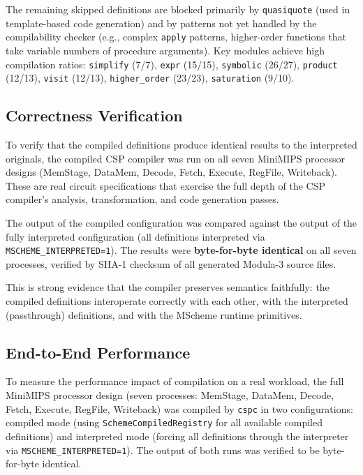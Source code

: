 \documentclass[12pt]{report}
\begin{document}
The remaining skipped definitions are blocked primarily by
\texttt{quasiquote} (used in template-based code generation)
and by patterns not yet handled by the compilability checker
(e.g., complex \texttt{apply} patterns, higher-order functions
that take variable numbers of procedure arguments).
Key modules achieve high compilation ratios:
\texttt{simplify} (7/7), \texttt{expr} (15/15),
\texttt{symbolic} (26/27), \texttt{product} (12/13),
\texttt{visit} (12/13), \texttt{higher\_order} (23/23),
\texttt{saturation} (9/10).

\subsection{Correctness Verification}

To verify that the compiled definitions produce identical results
to the interpreted originals, the compiled CSP compiler was run on
all seven MiniMIPS processor designs (MemStage, DataMem, Decode,
Fetch, Execute, RegFile, Writeback).  These are real circuit
specifications that exercise the full depth of the CSP compiler's
analysis, transformation, and code generation passes.

The output of the compiled configuration was compared against the
output of the fully interpreted configuration (all definitions
interpreted via \texttt{MSCHEME\_INTERPRETED=1}).
The results were \textbf{byte-for-byte identical} on all seven
processes, verified by SHA-1 checksum of all generated Modula-3
source files.

This is strong evidence that the compiler preserves semantics
faithfully: the compiled definitions interoperate correctly
with each other, with the interpreted (passthrough) definitions, and with
the MScheme runtime primitives.

\subsection{End-to-End Performance}
\label{sec:impl-cspc-perf}

To measure the performance impact of compilation on a real workload,
the full MiniMIPS processor design (seven processes: MemStage,
DataMem, Decode, Fetch, Execute, RegFile, Writeback) was compiled
by \texttt{cspc} in two configurations: compiled mode (using
\texttt{SchemeCompiledRegistry} for all available compiled
definitions) and interpreted mode (forcing all definitions through
the interpreter via \texttt{MSCHEME\_INTERPRETED=1}).
The output of both runs was verified to be byte-for-byte identical.
\end{document}
